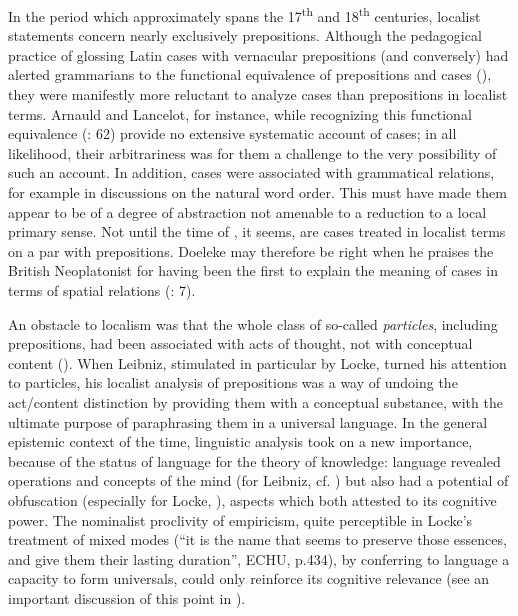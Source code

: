 \documentclass[output=paper]{langscibook}
\begin{document}
In the period which approximately spans the 17\textsuperscript{th} and 18\textsuperscript{th} centuries, localist statements concern nearly exclusively prepositions. Although the pedagogical practice of glossing Latin cases with vernacular prepositions (and conversely) had alerted grammarians to the functional equivalence of prepositions and cases (\citealt[26]{Colombat et al. 2010}), they were manifestly more reluctant to analyze cases than prepositions in localist terms. Arnauld and Lancelot, for instance, while recognizing this functional equivalence (\citealt{arnauld_grammaire_1969}: 62) provide no extensive systematic account of cases; in all likelihood, their arbitrariness was for them a challenge to the very possibility of such an account. In addition, cases were associated with grammatical relations, for example in discussions on the natural word order. This must have made them appear to be of a degree of abstraction not amenable to a reduction to a local primary sense. Not until the time of \citet{harris_hermes_1773}, it seems, are cases treated in localist terms on a par with prepositions. Doeleke may therefore be right when he praises the British Neoplatonist for having been the first to explain the meaning of cases in terms of spatial relations (\citeyear{doeleke_versuche_1814}: 7).

An obstacle to localism was that the whole class of so-called \textit{particles}, including prepositions, had been associated with acts of thought, not with conceptual content (\citealt{nuchelmans_historical_1986}). When Leibniz, stimulated in particular by Locke, turned his attention to particles, his localist analysis of prepositions was a way of undoing the act\slash content distinction by providing them with a conceptual substance, with the ultimate purpose of paraphrasing them in a universal language. In the general epistemic context of the time, linguistic analysis took on a new importance, because of the status of language for the theory of knowledge: language revealed operations and concepts of the mind (for Leibniz, cf. \citealt{dascal_leibniz_1990}) but also had a potential of obfuscation (especially for Locke, \citealt{dawson_locke_2007}), aspects which both attested to its cognitive power. The nominalist proclivity of empiricism, quite perceptible in Locke’s treatment of mixed modes (“it is the name that seems to preserve those essences, and give them their lasting duration”, ECHU, p.434), by conferring to language a capacity to form universals, could only reinforce its cognitive relevance (see an important discussion of this point in \citealt{formigari_language_1988}).
\end{document}
